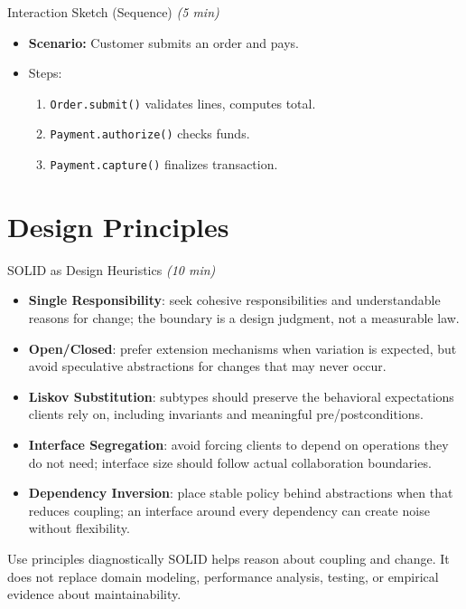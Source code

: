 \documentclass[aspectratio=169,11pt]{beamer}
\newcommand{\mins}[1]{\textit{(#1 min)}}
\begin{document}
\begin{frame}{Interaction Sketch (Sequence) \mins{5}}
\begin{itemize}
  \item \textbf{Scenario:} Customer submits an order and pays.
  \item Steps:
  \begin{enumerate}
    \item \texttt{Order.submit()} validates lines, computes total.
    \item \texttt{Payment.authorize()} checks funds.
    \item \texttt{Payment.capture()} finalizes transaction.
  \end{enumerate}
\end{itemize}
\end{frame}

\section{Design Principles}

\begin{frame}{SOLID as Design Heuristics \mins{10}}
  \begin{itemize}
    \item \textbf{Single Responsibility}: seek cohesive responsibilities and understandable reasons for change; the boundary is a design judgment, not a measurable law.
    \item \textbf{Open/Closed}: prefer extension mechanisms when variation is expected, but avoid speculative abstractions for changes that may never occur.
    \item \textbf{Liskov Substitution}: subtypes should preserve the behavioral expectations clients rely on, including invariants and meaningful pre/postconditions.
    \item \textbf{Interface Segregation}: avoid forcing clients to depend on operations they do not need; interface size should follow actual collaboration boundaries.
    \item \textbf{Dependency Inversion}: place stable policy behind abstractions when that reduces coupling; an interface around every dependency can create noise without flexibility.
  \end{itemize}

  \begin{alertbox}{Use principles diagnostically}
    SOLID helps reason about coupling and change. It does not replace domain modeling, performance analysis, testing, or empirical evidence about maintainability.
  \end{alertbox}
\end{frame}
\end{document}
